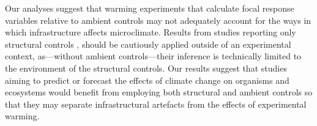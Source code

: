 \documentclass{article}
\begin{document}
\par Our analyses suggest that warming experiments that calculate focal response variables relative to ambient controls \citep[e.g.,][]{price1998,dunne2003,cleland2006,morin2010,marchin2015} may not adequately account for the ways in which infrastructure affects microclimate. Results from studies reporting only structural controls \citep [e.g.,][]{sherry2007,hoeppner2012, rollinson2012}, should be cautiously applied outside of an experimental context, as---without ambient controls---their inference is technically limited to the environment of the structural controls. Our results suggest that studies aiming to predict or forecast the effects of climate change on organisms and ecosystems would benefit from employing both structural and ambient controls so that they may separate infrastructural artefacts from the effects of experimental warming. 
\end{document}

